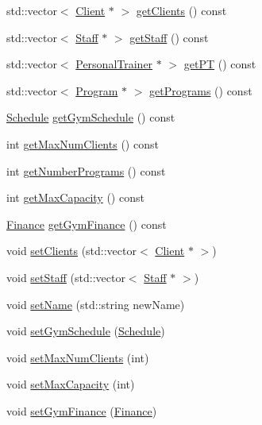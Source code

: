 \begin{DoxyCompactItemize}
\item 
std\+::vector$<$ \hyperlink{classClient}{Client} $\ast$ $>$ \hyperlink{classGym_aaf5c6971f484866ec9b06c07ed729c9b}{get\+Clients} () const 
\item 
std\+::vector$<$ \hyperlink{classStaff}{Staff} $\ast$ $>$ \hyperlink{classGym_aa441a21e10236a1b6046333399674775}{get\+Staff} () const 
\item 
std\+::vector$<$ \hyperlink{classPersonalTrainer}{Personal\+Trainer} $\ast$ $>$ \hyperlink{classGym_a66c34f89ebab7717ddb44190ff3eebad}{get\+PT} () const 
\item 
std\+::vector$<$ \hyperlink{classProgram}{Program} $\ast$ $>$ \hyperlink{classGym_a0dfcc7e8e43237f20926fdbc18e1d2d1}{get\+Programs} () const 
\item 
\hyperlink{classSchedule}{Schedule} \hyperlink{classGym_a35d53964a138bae3b5d43a5bcf9a92fc}{get\+Gym\+Schedule} () const 
\item 
int \hyperlink{classGym_a05e9aa0c7323a3d62ab548037b34c8ce}{get\+Max\+Num\+Clients} () const 
\item 
int \hyperlink{classGym_af72f16ba469bf2797cedea0c222d70d4}{get\+Number\+Programs} () const 
\item 
int \hyperlink{classGym_aa338e27dfc731ab09d5f97dd3029bce5}{get\+Max\+Capacity} () const 
\item 
\hyperlink{classFinance}{Finance} \hyperlink{classGym_a074ee7f6ddc777d8e2548efb61c8206b}{get\+Gym\+Finance} () const 
\item 
void \hyperlink{classGym_ad1c08f7d2e9ae1d5145519b787568e38}{set\+Clients} (std\+::vector$<$ \hyperlink{classClient}{Client} $\ast$ $>$)
\item 
void \hyperlink{classGym_a4971e6b588f4efb5bf26d00c7ec7ca96}{set\+Staff} (std\+::vector$<$ \hyperlink{classStaff}{Staff} $\ast$ $>$)
\item 
void \hyperlink{classGym_a1c3e6a842b0b18a9a42c61e25b595dac}{set\+Name} (std\+::string new\+Name)
\item 
void \hyperlink{classGym_a9de9ed60db03ef4ae27139429ad7f0b7}{set\+Gym\+Schedule} (\hyperlink{classSchedule}{Schedule})
\item 
void \hyperlink{classGym_a51b5bf6222862c232ad626bf243df7ba}{set\+Max\+Num\+Clients} (int)
\item 
void \hyperlink{classGym_ae115f7c1991fcb49ceec7cb5d94a6233}{set\+Max\+Capacity} (int)
\item 
void \hyperlink{classGym_a64286d629d0d2db01e9c880cbf1d69f7}{set\+Gym\+Finance} (\hyperlink{classFinance}{Finance})

\end{DoxyCompactItemize}
